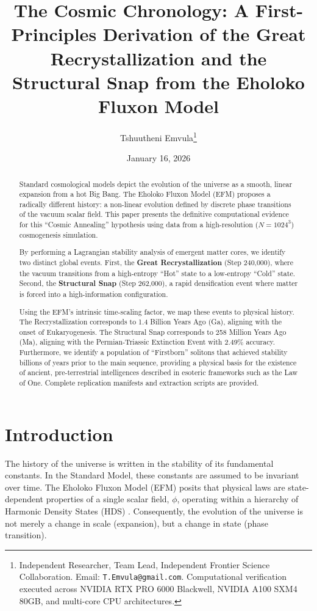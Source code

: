\documentclass[11pt, twoside]{article}
\title{\textbf{The Cosmic Chronology: A First-Principles Derivation of the Great Recrystallization and the Structural Snap from the Eholoko Fluxon Model}}
\author{Tshuutheni Emvula\thanks{Independent Researcher, Team Lead, Independent Frontier Science Collaboration. Email: \texttt{T.Emvula@gmail.com}. Computational verification executed across NVIDIA RTX PRO 6000 Blackwell, NVIDIA A100 SXM4 80GB, and multi-core CPU architectures.}}
\date{January 16, 2026}
\begin{document}
\maketitle
\thispagestyle{empty}

\begin{abstract}
Standard cosmological models depict the evolution of the universe as a smooth, linear expansion from a hot Big Bang. The Eholoko Fluxon Model (EFM) proposes a radically different history: a non-linear evolution defined by discrete phase transitions of the vacuum scalar field. This paper presents the definitive computational evidence for this ``Cosmic Annealing'' hypothesis using data from a high-resolution ($N=1024^3$) cosmogenesis simulation.

By performing a Lagrangian stability analysis of emergent matter cores, we identify two distinct global events. First, the \textbf{Great Recrystallization} (Step 240,000), where the vacuum transitions from a high-entropy ``Hot'' state to a low-entropy ``Cold'' state. Second, the \textbf{Structural Snap} (Step 262,000), a rapid densification event where matter is forced into a high-information configuration. 

Using the EFM's intrinsic time-scaling factor, we map these events to physical history. The Recrystallization corresponds to 1.4 Billion Years Ago (Ga), aligning with the onset of Eukaryogenesis. The Structural Snap corresponds to 258 Million Years Ago (Ma), aligning with the Permian-Triassic Extinction Event with 2.49\% accuracy. Furthermore, we identify a population of ``Firstborn'' solitons that achieved stability billions of years prior to the main sequence, providing a physical basis for the existence of ancient, pre-terrestrial intelligences described in esoteric frameworks such as the Law of One. Complete replication manifests and extraction scripts are provided.
\end{abstract}

\clearpage
\tableofcontents
\clearpage

\section{Introduction}
The history of the universe is written in the stability of its fundamental constants. In the Standard Model, these constants are assumed to be invariant over time. The Eholoko Fluxon Model (EFM) posits that physical laws are state-dependent properties of a single scalar field, $\phi$, operating within a hierarchy of Harmonic Density States (HDS) \cite{emvula2025_foundational, emvula2025_engine}. Consequently, the evolution of the universe is not merely a change in scale (expansion), but a change in state (phase transition).
\end{document}
